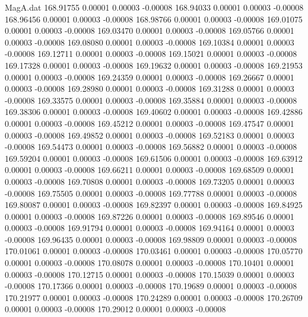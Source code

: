 \begin{filecontents}{MagA.dat}
 168.91755    0.00001    0.00003   -0.00008
 168.94033    0.00001    0.00003   -0.00008
 168.96456    0.00001    0.00003   -0.00008
 168.98766    0.00001    0.00003   -0.00008
 169.01075    0.00001    0.00003   -0.00008
 169.03470    0.00001    0.00003   -0.00008
 169.05766    0.00001    0.00003   -0.00008
 169.08080    0.00001    0.00003   -0.00008
 169.10384    0.00001    0.00003   -0.00008
 169.12711    0.00001    0.00003   -0.00008
 169.15021    0.00001    0.00003   -0.00008
 169.17328    0.00001    0.00003   -0.00008
 169.19632    0.00001    0.00003   -0.00008
 169.21953    0.00001    0.00003   -0.00008
 169.24359    0.00001    0.00003   -0.00008
 169.26667    0.00001    0.00003   -0.00008
 169.28980    0.00001    0.00003   -0.00008
 169.31288    0.00001    0.00003   -0.00008
 169.33575    0.00001    0.00003   -0.00008
 169.35884    0.00001    0.00003   -0.00008
 169.38306    0.00001    0.00003   -0.00008
 169.40602    0.00001    0.00003   -0.00008
 169.42886    0.00001    0.00003   -0.00008
 169.45212    0.00001    0.00003   -0.00008
 169.47547    0.00001    0.00003   -0.00008
 169.49852    0.00001    0.00003   -0.00008
 169.52183    0.00001    0.00003   -0.00008
 169.54473    0.00001    0.00003   -0.00008
 169.56882    0.00001    0.00003   -0.00008
 169.59204    0.00001    0.00003   -0.00008
 169.61506    0.00001    0.00003   -0.00008
 169.63912    0.00001    0.00003   -0.00008
 169.66211    0.00001    0.00003   -0.00008
 169.68509    0.00001    0.00003   -0.00008
 169.70808    0.00001    0.00003   -0.00008
 169.73205    0.00001    0.00003   -0.00008
 169.75505    0.00001    0.00003   -0.00008
 169.77788    0.00001    0.00003   -0.00008
 169.80087    0.00001    0.00003   -0.00008
 169.82397    0.00001    0.00003   -0.00008
 169.84925    0.00001    0.00003   -0.00008
 169.87226    0.00001    0.00003   -0.00008
 169.89546    0.00001    0.00003   -0.00008
 169.91794    0.00001    0.00003   -0.00008
 169.94164    0.00001    0.00003   -0.00008
 169.96435    0.00001    0.00003   -0.00008
 169.98809    0.00001    0.00003   -0.00008
 170.01061    0.00001    0.00003   -0.00008
 170.03461    0.00001    0.00003   -0.00008
 170.05770    0.00001    0.00003   -0.00008
 170.08078    0.00001    0.00003   -0.00008
 170.10401    0.00001    0.00003   -0.00008
 170.12715    0.00001    0.00003   -0.00008
 170.15039    0.00001    0.00003   -0.00008
 170.17366    0.00001    0.00003   -0.00008
 170.19689    0.00001    0.00003   -0.00008
 170.21977    0.00001    0.00003   -0.00008
 170.24289    0.00001    0.00003   -0.00008
 170.26709    0.00001    0.00003   -0.00008
 170.29012    0.00001    0.00003   -0.00008

\end{filecontents}
